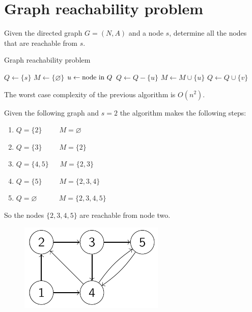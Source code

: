 \documentclass[12pt, a4paper]{report}
\newtheorem[style=M,bodystyle=\normalfont]{proposition}{Proposition}
\newtheorem[style=M,bodystyle=\normalfont]{theorem}{Theorem}
\newtheorem[style=M,bodystyle=\normalfont]{corollary}{Corollary}
\newtheorem[style=M,bodystyle=\normalfont]{lemma}{Lemma}
\newtheorem[style=M,bodystyle=\normalfont]{definition}{Definition}
\begin{document}
    \section{Graph reachability problem}
    Given the directed graph $G=(N,A)$ and a node $s$, determine all the nodes that are reachable from $s$. 
    \begin{algorithm}[H]
        \caption{Graph reachability problem}
            \begin{algorithmic}[1]
                \State $Q \leftarrow \{s\}$
                \State $M \leftarrow \{\varnothing\}$
                    \State $u \leftarrow \textnormal{node in } Q$
                    \State $Q \leftarrow Q-\{u\}$
                    \State $M \leftarrow M \cup \{u\}$
                            \State $Q \leftarrow Q \cup \{v\}$
                        \EndIf
                    \EndFor
                \EndWhile
            \end{algorithmic}
    \end{algorithm}
    The worst case complexity of the previous algorithm is $O(n^2)$.
    \begin{example}
        Given the following graph and $s=2$ the algorithm makes the following steps: 
        \begin{enumerate}
            \item $Q=\{2\} \:\:\:\:\:\:\:\:\:\:\: M=\varnothing$
            \item $Q=\{3\} \:\:\:\:\:\:\:\:\:\:\: M=\{2\}$
            \item $Q=\{4,5\} \:\:\:\:\:\:\: M=\{2,3\}$
            \item $Q=\{5\} \:\:\:\:\:\:\:\:\:\:\: M=\{2,3,4\}$
            \item $Q=\varnothing \:\:\:\:\:\:\:\:\:\:\:\:\:\: M=\{2,3,4,5\}$
        \end{enumerate}
        So the nodes $\{2,3,4,5\}$ are reachable from node two. 
        \begin{figure}[H]
            \centering
            \includegraphics[width=0.3\linewidth]{images/graphs.png}
        \end{figure}
    \end{example}
\end{document}
